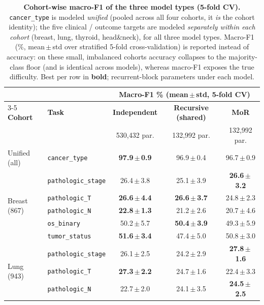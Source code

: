 \documentclass[11pt]{article}
\newcommand{\best}[1]{\textbf{#1}}
\begin{document}
\begin{table}[h]
\centering
\caption{\textbf{Cohort-wise macro-F1 of the three model types (5-fold CV).}
\texttt{cancer\_type} is modeled \emph{unified} (pooled across all four cohorts, it \emph{is}
the cohort identity); the five clinical / outcome targets are modeled \emph{separately within
each cohort} (breast, lung, thyroid, head\&neck), for all three model types. Macro-F1 (\%,
mean\,$\pm$\,std over stratified 5-fold cross-validation) is reported instead of accuracy:
on these small, imbalanced cohorts accuracy collapses to the majority-class floor (and is
identical across models), whereas macro-F1 exposes the true difficulty. Best per row in
\textbf{bold}; recurrent-block parameters under each model.}
\label{tab:tasks}
\setlength{\tabcolsep}{5pt}
\footnotesize
\begin{tabular}{l l c c c}
\toprule
& & \multicolumn{3}{c}{\textbf{Macro-F1 \% (mean\,$\pm$\,std, 5-fold CV)}} \\
\cmidrule(lr){3-5}
\textbf{Cohort} & \textbf{Task} &
\textbf{Independent} & \textbf{Recursive (shared)} & \textbf{MoR} \\
& & {\footnotesize 530{,}432 par.} & {\footnotesize 132{,}992 par.} & {\footnotesize 132{,}992 par.} \\
\midrule
\rowcolor{morblue} Unified (all) & \texttt{cancer\_type} & \best{97.9\,$\pm$\,0.9} & 96.9\,$\pm$\,0.4 & 96.7\,$\pm$\,0.9 \\
\midrule
\multirow{5}{*}{Breast (867)}
 & \texttt{pathologic\_stage} & 26.4\,$\pm$\,3.8 & 25.1\,$\pm$\,3.9 & \best{26.6\,$\pm$\,3.2} \\
 & \texttt{pathologic\_T}     & \best{26.6\,$\pm$\,4.4} & \best{26.6\,$\pm$\,3.7} & 24.8\,$\pm$\,2.3 \\
 & \texttt{pathologic\_N}     & \best{22.8\,$\pm$\,1.3} & 21.2\,$\pm$\,2.6 & 20.7\,$\pm$\,4.6 \\
 & \texttt{os\_binary}        & 50.2\,$\pm$\,5.7 & \best{50.4\,$\pm$\,3.9} & 49.3\,$\pm$\,5.9 \\
 & \texttt{tumor\_status}     & \best{51.6\,$\pm$\,3.4} & 47.4\,$\pm$\,5.0 & 50.8\,$\pm$\,3.0 \\
\midrule
\multirow{5}{*}{Lung (943)}
 & \texttt{pathologic\_stage} & 26.1\,$\pm$\,2.5 & 24.2\,$\pm$\,2.9 & \best{27.8\,$\pm$\,1.6} \\
 & \texttt{pathologic\_T}     & \best{27.3\,$\pm$\,2.2} & 24.7\,$\pm$\,1.6 & 22.4\,$\pm$\,3.3 \\
 & \texttt{pathologic\_N}     & 22.7\,$\pm$\,2.0 & 24.1\,$\pm$\,3.5 & \best{24.5\,$\pm$\,2.5} \\

\end{tabular}
\end{table}
\end{document}
